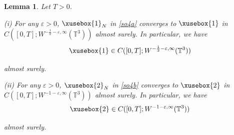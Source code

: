 \documentclass[%
11pt,  reqno]{amsart}
\def\<#1>{\xusebox{#1}}
\newtheorem{lemma}[theorem]{Lemma}
\newcommand{\1}{\hspace{0.2mm}\text{I}\hspace{0.2mm}}
\newcommand{\noi}{\noindent}
\newcommand{\T}{\mathbb{T}}
\newcommand{\eps}{\varepsilon}
\numberwithin{equation}{section}
\numberwithin{theorem}{section}
\begin{document}
\begin{lemma}\label{LEM:stoconv}
Let  $T >0$.

\smallskip

\noi
\textup{(i)}
For any $\eps > 0$, 
$ \<1>_N $  in \eqref{so4a} converges to $\<1>$
in $C([0,T];W^{- \frac 12 -\eps,\infty}(\T^3))$ almost surely.
 In particular, we have
  \[\<1> \in C([0,T];W^{- \frac 12 -\eps,\infty}(\T^3))
  \]
  
  \noi
  almost surely.

\smallskip

\noi
\textup{(ii)}
For any $\eps > 0$, 
$ \<2>_N $  in \eqref{so4b} converges to $\<2>$
 in 
$C([0,T];W^{- 1-\eps,\infty}(\T^3))$ almost surely.
 In particular, we have
 \[\<2> \in C([0,T];W^{-1-\eps,\infty}(\T^3))\]
 
 \noi
 almost surely.


\end{lemma}
\end{document}
